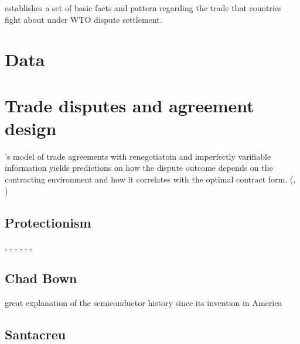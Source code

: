 \documentclass[10pt]{article} %
\begin{document}
    \cite{BownReynolds2014} establishes a set of basic facts and pattern regarding the trade that countries fight about under WTO dispute settlement.


\section{Data}

\section{Trade disputes and agreement design}
\cite{MaggiStaiger2018}'s model of trade agreements with renegotiatoin and imperfectly varifiable information yields predictions on how the dispute outcome depends on the contracting environment and how it correlates with the optimal contract form. (\cite{MaggiStaiger2011}, \cite{MaggiStaiger2015})

\subsection{Protectionism}
\cite{Mayer1984}, \cite{GrossmanHelpman1994}, \cite{GrossmanHelpman1995}, \cite{GrossmanHelpman1996}, \cite{GoldbergMaggi1999}, \cite{GawandeBandyopadhyay2000}, \cite{EderingtonMinier2008}

\subsection{Chad Bown}
great explanation of the semiconductor history since its invention in America \cite{Bown2020}

\subsection{Santacreu}
\cite{Santacreu2022}

\newpage
\footnotesize


\end{document}

